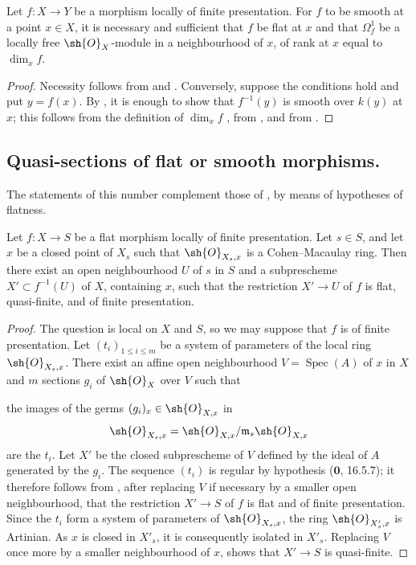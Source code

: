 \begin{proposition}[17.15.15]
\label{IV.17.15.15}
Let $f:X\to Y$ be a morphism locally of finite presentation.
For $f$ to be smooth at a point $x\in X$, it is necessary and sufficient that $f$ be flat at $x$ and that $\Omega^1_f$ be a locally free $\sh{O}_X$-module in a neighbourhood of $x$, of rank at $x$ equal to $\dim_x f$.
\end{proposition}

\begin{proof}
Necessity follows from  and .  Conversely, suppose the conditions hold and put $y=f(x)$.  By , it is enough to show that $f^{-1}(y)$ is smooth over $k(y)$ at $x$; this follows from the definition of $\dim_x f$ , from , and from .
\end{proof}


\subsection{Quasi-sections of flat or smooth morphisms.}
\label{subsection:IV.17.16}

The statements of this number complement those of , by means of hypotheses of flatness.

\begin{proposition}[17.16.1]
\label{IV.17.16.1}
Let $f:X\to S$ be a flat morphism locally of finite presentation.  Let $s\in S$, and let $x$ be a closed point of $X_s$ such that $\sh{O}_{X_s,x}$ is a Cohen--Macaulay ring.  Then there exist an open neighbourhood $U$ of $s$ in $S$ and a subprescheme $X'\subset f^{-1}(U)$ of $X$, containing $x$, such that the restriction $X'\to U$ of $f$ is flat, quasi-finite, and of finite presentation.
\end{proposition}

\begin{proof}
The question is local on $X$ and $S$, so we may suppose that $f$ is of finite presentation.  Let $(t_i)_{1\leq i\leq m}$ be a system of parameters of the local ring $\sh{O}_{X_s,x}$.  There exist an affine open neighbourhood $V=\operatorname{Spec}(A)$ of $x$ in $X$ and $m$ sections $g_i$ of $\sh{O}_X$ over $V$ such that

the images of the germs $(g_i)_x\in\sh{O}_{X,x}$ in
\[
 \sh{O}_{X_s,x}=\sh{O}_{X,x}/\mathfrak m_s\sh{O}_{X,x}
\]
are the $t_i$.  Let $X'$ be the closed subprescheme of $V$ defined by the ideal of $A$ generated by the $g_i$.  The sequence $(t_i)$ is regular by hypothesis ($\mathbf{0}$, 16.5.7); it therefore follows from , after replacing $V$ if necessary by a smaller open neighbourhood, that the restriction $X'\to S$ of $f$ is flat and of finite presentation.  Since the $t_i$ form a system of parameters of $\sh{O}_{X_s,x}$, the ring $\sh{O}_{X'_s,x}$ is Artinian.  As $x$ is closed in $X'_s$, it is consequently isolated in $X'_s$.  Replacing $V$ once more by a smaller neighbourhood of $x$,  shows that $X'\to S$ is quasi-finite.
\end{proof}

